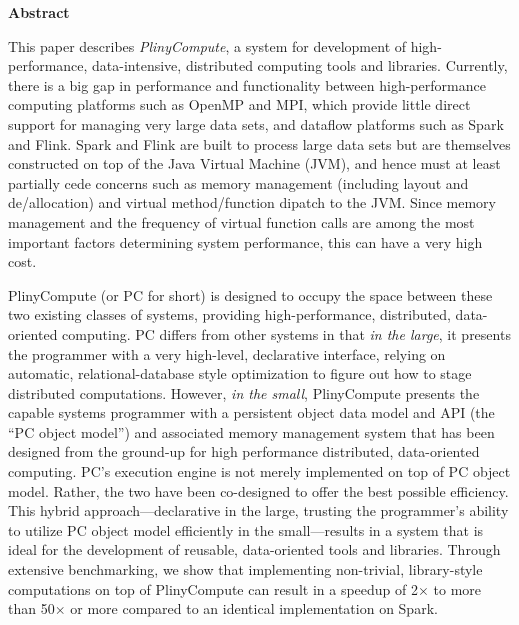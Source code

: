 
\noindent
\textbf{Abstract}

\noindent
This paper describes \emph{PlinyCompute}, a system for development of
high-performance, data-intensive, distributed computing tools and libraries.
Currently, there is a big gap in performance and functionality between 
high-performance computing platforms such as OpenMP and MPI, which provide little direct support for
managing very large data sets, and dataflow platforms such as Spark and Flink.  Spark and Flink
are built to process large data sets but are themselves constructed on top of the
Java Virtual Machine (JVM), and hence must
at least partially cede concerns such as 
memory management (including layout and de/allocation) and virtual method/function dipatch to the JVM. Since memory management 
and the frequency of virtual function calls are
among the most important factors determining system performance,
this can have a very high cost.

PlinyCompute (or PC for short) is designed to occupy the space between these two 
existing classes of systems, providing high-performance, distributed, data-oriented computing.
PC differs from other systems in that \emph{in the large}, it presents the programmer with a very high-level,
declarative interface, relying on automatic, relational-database style optimization to figure out how to stage
distributed computations.  However, \emph{in the small}, PlinyCompute presents the capable systems programmer with a
persistent object data model and API (the ``PC object model'') and associated memory management system
that has been designed from the ground-up for
high performance distributed, data-oriented computing.
PC's execution engine is not merely implemented on top of
PC object model.  Rather, the two have been co-designed to offer the best possible efficiency.
This hybrid approach---declarative in the large, trusting the programmer's ability
to utilize PC object model efficiently
in the small---results in a system that is ideal for the development of reusable, data-oriented tools and libraries.
Through extensive benchmarking, we show that implementing non-trivial, library-style computations 
on top of PlinyCompute can result in a speedup of 2$\times$ to
more than 
50$\times$ or more compared to an identical implementation on Spark.
